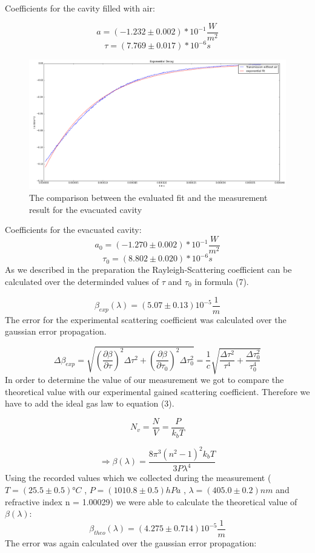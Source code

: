 \documentclass[10pt,a4paper]{article}
\begin{document}
Coefficients for the cavity filled with air:

$$ a = (-1.232 \pm 0.002 ) * 10^{-1}\frac{W}{m^{2}} $$
$$ \tau = (7.769 \pm 0.017) * 10^{-6} s $$

\begin{figure}[h]
	\includegraphics[scale = 0.7]{expvac.png}
	\centering
	\caption{The comparison between the evaluated fit and the measurement result for the evacuated cavity}
	\label{exponential vac}
\end{figure}
Coefficients for the evacuated cavity:
$$ a_{0} = (-1.270 \pm 0.002 ) * 10^{-1}\frac{W}{m^{2}} $$
$$ \tau_{0} = (8.802 \pm 0.020) * 10^{-6} s $$
As we described in the preparation the Rayleigh-Scattering coefficient can be calculated over the determinded values of $\tau$ and $\tau_{0}$ in formula (7). 

$$ \beta_{exp}(\lambda) = (5.07 \pm 0.13) 10^{-5}\frac{1}{m} $$
The error for the experimental scattering coefficient was calculated over the gaussian error propagation.

\begin{equation}
\Delta \beta_{exp} = \sqrt{(\frac{\partial \beta}{\partial \tau})^{2}\Delta \tau^{2} + (\frac{\partial \beta}{\partial \tau_{0}})^{2}\Delta \tau_{0}^{2}} = \frac{1}{c} \sqrt{\frac{\Delta \tau^{2}}{\tau^{4}} + \frac{\Delta \tau_{0}^{2}}{\tau_{0}^{4}} }
\end{equation}
In order to determine the value of our measurement we got to compare the theoretical value with our experimental gained scattering coefficient. Therefore we have to add the ideal gas law to equation (3).

$$ N_{v} = \frac{N}{V} = \frac{P}{k_{b}T} $$

\begin{equation}
 \Rightarrow \beta(\lambda) = \frac{8\pi^{3}(n^{2}-1)^{2}k_{b}T}{3P \lambda^{4}} 
\end{equation}
Using the recorded values which we collected during the measurement ($T = (25.5 \pm 0.5) °C$ , $ P = (1010.8 \pm 0.5) hPa$ , $\lambda = (405.0 \pm 0.2) nm$ and refractive index n = 1.00029) we were able to calculate the theoretical value of $\beta (\lambda)$:
$$ \beta_{theo} (\lambda) = (4.275 \pm 0.714) 10^{-5} \frac{1}{m} $$
The error was again calculated over the gaussian error propagation:
\end{document}
